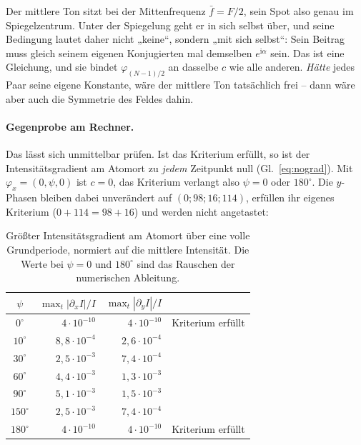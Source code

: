 \documentclass[11pt,a4paper]{article}
\begin{document}
Der mittlere Ton sitzt bei der Mittenfrequenz $\bar f = F/2$, sein Spot also
genau im Spiegelzentrum. Unter der Spiegelung geht er in sich selbst über,
und seine Bedingung lautet daher nicht „keine``, sondern „mit sich selbst``:
Sein Beitrag muss gleich seinem eigenen Konjugierten mal demselben
$e^{\mathrm{i}\alpha}$ sein. Das ist eine Gleichung, und sie bindet
$\varphi_{(N-1)/2}$ an dasselbe $c$ wie alle anderen. \emph{Hätte} jedes Paar
seine eigene Konstante, wäre der mittlere Ton tatsächlich frei -- dann wäre
aber auch die Symmetrie des Feldes dahin.

\paragraph{Gegenprobe am Rechner.}
Das lässt sich unmittelbar prüfen. Ist das Kriterium erfüllt, so ist der
Intensitätsgradient am Atomort zu \emph{jedem} Zeitpunkt null
(Gl.~\eqref{eq:nograd}). Mit $\varphi_x = (0,\psi,0)$ ist $c = 0$, das
Kriterium verlangt also $\psi = 0$ oder $180^\circ$. Die $y$-Phasen bleiben
dabei unverändert auf $(0;98;16;114)$, erfüllen ihr eigenes Kriterium
($0+114 = 98+16$) und werden nicht angetastet:

\begin{table}[htb]
  \centering
  \caption{Größter Intensitätsgradient am Atomort über eine volle
  Grundperiode, normiert auf die mittlere Intensität. Die Werte bei
  $\psi = 0$ und $180^\circ$ sind das Rauschen der numerischen Ableitung.}
  \label{tab:midphase}
  \begin{tabular}{crrl}
    \toprule
    $\psi$ & $\max_t|\partial_x I|/I$ & $\max_t|\partial_y I|/I$ & \\
    \midrule
    $0^\circ$   & $4\cdot10^{-10}$ & $4\cdot10^{-10}$ & Kriterium erfüllt\\
    $10^\circ$  & $8{,}8\cdot10^{-4}$ & $2{,}6\cdot10^{-4}$ & \\
    $30^\circ$  & $2{,}5\cdot10^{-3}$ & $7{,}4\cdot10^{-4}$ & \\
    $60^\circ$  & $4{,}4\cdot10^{-3}$ & $1{,}3\cdot10^{-3}$ & \\
    $90^\circ$  & $5{,}1\cdot10^{-3}$ & $1{,}5\cdot10^{-3}$ & \\
    $150^\circ$ & $2{,}5\cdot10^{-3}$ & $7{,}4\cdot10^{-4}$ & \\
    $180^\circ$ & $4\cdot10^{-10}$ & $4\cdot10^{-10}$ & Kriterium erfüllt\\
    \bottomrule
  \end{tabular}
\end{table}
\end{document}
